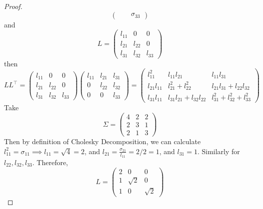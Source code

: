 \documentclass[preprint,12pt]{elsarticle}
\begin{document}
\begin{proof}
\begin{equation}
\begin{pmatrix}
             & & \sigma_{33}
        \end{pmatrix}
\end{equation}
and
\begin{equation}
    L = 
    \begin{pmatrix}
        l_{11} & 0 & 0\\
        l_{21} & l_{22} & 0 \\
        l_{31} & l_{32} & l_{33}
    \end{pmatrix}
\end{equation}
then
\begin{equation}
    LL^{\top}=
    \begin{pmatrix}
        l_{11} & 0 & 0\\
        l_{21} & l_{22} & 0 \\
        l_{31} & l_{32} & l_{33}
    \end{pmatrix}
    \begin{pmatrix}
        l_{11} & l_{21} & l_{31}\\
        0 & l_{22} & l_{32} \\
        0 & 0 & l_{33}
    \end{pmatrix}
    =
    \begin{pmatrix}
        l_{11}^2 & l_{11}l_{21} & l_{11}l_{31} \\ 
        l_{21}l_{11} & l_{21}^2+l_{22}^2 & l_{21}l_{31} + l_{22}l_{32} \\
        l_{31}l_{11} & l_{31}l_{21} + l_{32}l_{22} & l_{31}^2+l_{32}^2+l_{33}^2
    \end{pmatrix}
\end{equation}
Take 
\begin{equation}
    \Sigma=
    \begin{pmatrix}
        4 & 2 & 2\\
        2 & 3 & 1\\
        2 & 1 & 3
    \end{pmatrix}
\end{equation}
Then by definition of Cholesky Decomposition, we can calculate $l_{11}^2=\sigma_{11}\implies l_{11}=\sqrt{4}=2$, and $l_{21}=\frac{\sigma_{21}}{l_{11}}=2/2=1$, and $l_{31}=1$. Similarly for $l_{22}, l_{32}, l_{33}$. Therefore, 
\begin{equation}
    L=
    \begin{pmatrix}
        2 & 0 & 0 \\
        1 & \sqrt{2} & 0\\
        1 & 0 & \sqrt{2}
    \end{pmatrix}

\end{equation}
\end{proof}
\end{document}

